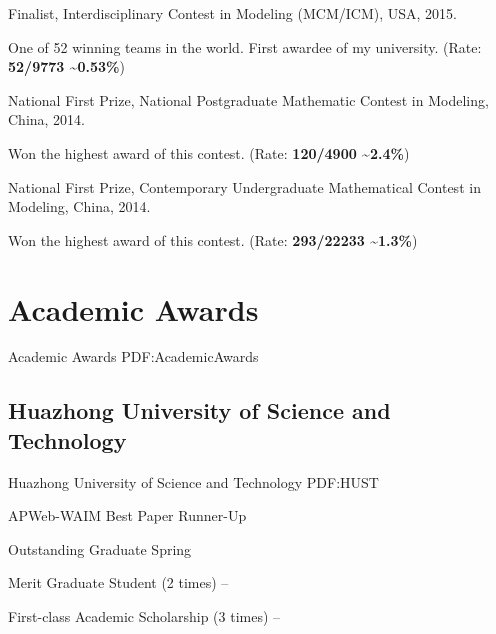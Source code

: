 \documentclass[letterpaper,10pt,oneside]{article}
\begin{document}
\begin{body}

\BulletItem
Finalist, Interdisciplinary Contest in Modeling (MCM/ICM), USA, 2015.
\begin{detail}
\SubBulletItem
One of 52 winning teams in the world. First awardee of my university. (Rate: \textbf{52/9773 \textasciitilde0.53\%})
\end{detail}

\Gap
\BulletItem
National First Prize, National Postgraduate Mathematic Contest in Modeling, China, 2014.
\begin{detail}
\SubBulletItem
Won the highest award of this contest. 
(Rate: \textbf{120/4900 \textasciitilde2.4\%}) 
\end{detail}

\Gap
\BulletItem
National First Prize, Contemporary Undergraduate Mathematical Contest in Modeling, China, 2014.
\begin{detail}
\SubBulletItem
Won the highest award of this contest.
(Rate: \textbf{293/22233 \textasciitilde1.3\%})
\end{detail}


\section
{Academic Awards}
{Academic Awards}
{PDF:AcademicAwards}

\subsection
{Huazhong University of Science and Technology}
{Huazhong University of Science and Technology}
{PDF:HUST}
\GapNoBreak

\BulletItem
APWeb-WAIM Best Paper Runner-Up
\hfill
{}

\GapNoBreak

\BulletItem
Outstanding Graduate
\hfill
Spring 

\GapNoBreak

\BulletItem
Merit Graduate Student (2 times)
\hfill
{} --

\GapNoBreak
\BulletItem
First-class Academic Scholarship (3 times)
\hfill
{} --
\BigGap
\GapNoBreak

\end{body}
\end{document}
